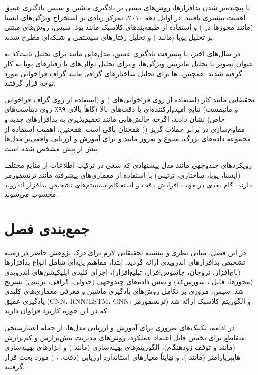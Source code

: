 با پیچیده‌تر شدن بدافزارها، روش‌های مبتنی بر یادگیری ماشین و سپس یادگیری عمیق اهمیت بیشتری یافتند. در اوایل دهه ۲۰۱۰، تمرکز زیادی بر استخراج ویژگی‌های ایستا (مانند مجوزها در  \cite{Drebin}) و استفاده از طبقه‌بندهای کلاسیک مانند  بود. سپس، روش‌های مبتنی بر تحلیل پویا (مانند  \cite{TaintDroid}) و تحلیل رفتارهای سیستمی و شبکه‌ای مطرح شدند.

در سال‌های اخیر، با پیشرفت یادگیری عمیق، مدل‌هایی مانند  برای تحلیل بایت‌کد به عنوان تصویر \cite{Nataraj2011} یا تحلیل ماتریس ویژگی‌ها، و  برای تحلیل توالی‌های  یا رفتارهای پویا به کار گرفته شدند. همچنین، ها برای تحلیل ساختارهای گرافی مانند گراف فراخوانی \cite{Zhu2018} مورد توجه قرار گرفتند.

تحقیقاتی مانند کار \textcite{ZhangNix2017} (استفاده از  روی فراخوانی‌های ) و \textcite{Zhu2018} (استفاده از  روی گراف فراخوانی و مانیفست) نتایج امیدوارکننده‌ای با دقت‌های بالا (گاهاً بالای ۹۹٪ روی دیتاست‌های خاص) نشان دادند، اگرچه چالش‌هایی مانند تعمیم‌پذیری به بدافزارهای جدید و مقاوم‌سازی در برابر حملات گریز () \cite{Demontis2017} همچنان باقی است. همچنین، اهمیت استفاده از مجموعه داده‌های بزرگ، متنوع و به‌روز مانند  \cite{AndroZoo} و  \cite{CICMalDroid} برای آموزش و ارزیابی واقعی‌تر مدل‌ها بیش از پیش مشخص شده است \cite{Lashkari2020, Pendlebury2019}.

رویکردهای چندوجهی مانند مدل پیشنهادی  که سعی در ترکیب اطلاعات از منابع مختلف (ایستا، پویا، ساختاری، ترتیبی) با استفاده از معماری‌های پیشرفته مانند ترنسفورمر دارند، گام بعدی در جهت افزایش دقت و استحکام سیستم‌های تشخیص بدافزار اندروید محسوب می‌شوند.

\section{جمع‌بندی فصل}
در این فصل، مبانی نظری و پیشینه تحقیقاتی لازم برای درک پژوهش حاضر در زمینه تشخیص بدافزارهای اندرویدی ارائه گردید. ابتدا، مفاهیم پایه‌ای شامل انواع بدافزارها (باج‌افزار، تروجان، جاسوس‌افزار، تبلیغ‌افزار)، اجزای کلیدی اپلیکیشن‌های اندرویدی (مجوزها، فایل ، سورس‌کد) و نقش داده‌های چندوجهی (جدولی، گرافی، ترتیبی) تشریح شد. سپس، مروری بر تکامل روش‌های یادگیری ماشین و معرفی معماری‌های کلیدی یادگیری عمیق (CNN، RNN/LSTM، GNN، ترنسفورمر) و الگوریتم کلاسیک  ارائه شد که در این حوزه کاربرد فراوان دارند.

در ادامه، تکنیک‌های ضروری برای آموزش و ارزیابی مدل‌ها، از جمله اعتبارسنجی متقاطع برای تخمین قابل اعتماد عملکرد، روش‌های مدیریت بیش‌برازش و کم‌برازش (مانند  و توقف زودهنگام)، الگوریتم‌های بهینه‌سازی (مانند ) و ابزارهای بهینه‌سازی هایپرپارامتر (مانند )، و نهایتاً معیارهای استاندارد ارزیابی (دقت، ، ) مورد بحث قرار گرفتند.

